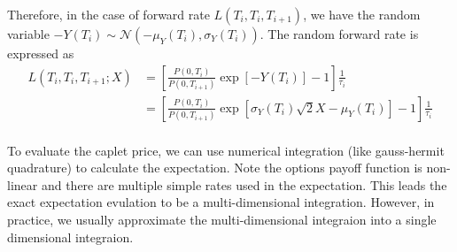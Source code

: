 \documentclass[12pt]{article}
\newcommand{\normaldist}{\mathcal{N}}
\begin{document}
Therefore, in the case of forward rate $L(T_i, T_i, T_{i+1})$,
we have the random variable $-Y(T_i)\sim \normaldist(-\mu_Y(T_i),
\sigma_Y(T_i))$. The random forward rate is expressed as
\begin{align}
    \nonumber
   L(T_i, T_i, T_{i+1}; X) 
   &= \left[
    \frac{P(0, T_i)}{P(0, T_{i+1})} \exp\left[-Y(T_i)\right] 
    - 1
   \right]   \frac{1}{\tau_i} \\
   &= \left[
    \frac{P(0, T_i)}{P(0, T_{i+1})} \exp
    \left[\sigma_Y(T_i) \sqrt{2} X - \mu_{Y}(T_i)\right] 
    - 1
   \right]   \frac{1}{\tau_i} \\
\end{align}

To evaluate the caplet price, we can use numerical
integration (like gauss-hermit quadrature)
to calculate the expectation. Note the options payoff
function is non-linear and there are multiple simple rates
used in the expectation. This leads the exact expectation
evulation to be a multi-dimensional integration. However,
in practice, we usually approximate the multi-dimensional
integraion into a single dimensional integraion.
\end{document}
